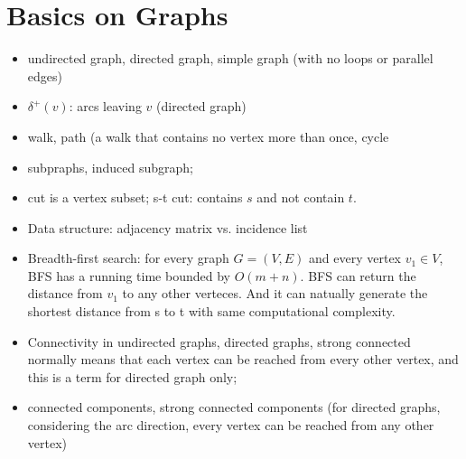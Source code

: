 \documentclass{article}
\begin{document}
\section{Basics on Graphs}
\begin{itemize}
\item undirected graph, directed graph, simple graph (with no loops or parallel edges)
\item $\delta^+(v)$: arcs leaving $v$ (directed graph)
\item walk, path (a walk that contains no vertex more than once, cycle
\item subpraphs, induced subgraph;
\item cut is a vertex subset; s-t cut: contains $s$ and not contain $t$.
\item Data structure: adjacency matrix vs. incidence list
\item Breadth-first search: for every graph $G = (V,E)$ and every vertex $v_1\in V$, BFS has a running time bounded by $O(m+n)$. BFS can return the distance from $v_1$ to any other verteces. And it can natually generate the shortest distance from s to t with same computational complexity.
\item Connectivity in undirected graphs, directed graphs, strong connected normally means that each vertex can be reached from every other vertex, and this is a term for directed graph only;
\item connected components, strong connected components (for directed graphs, considering the arc direction, every vertex can be reached from any other vertex)
\end{itemize}
\end{document}
